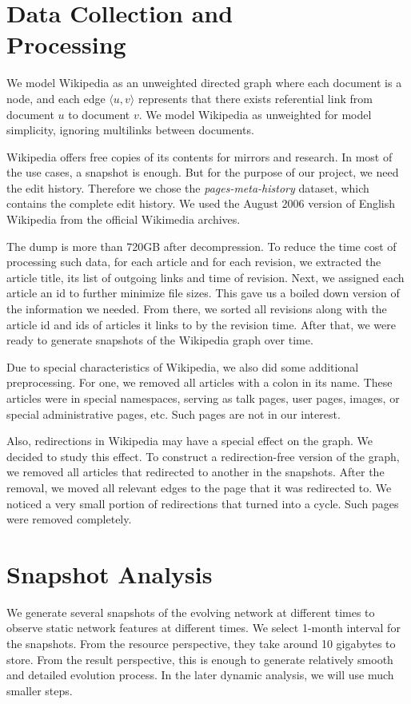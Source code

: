 \documentclass[10pt,twocolumn]{article}
\begin{document}
\section{Data Collection and\\ Processing}
We model Wikipedia as an unweighted directed graph where each document is a node, and each edge $\langle u, v \rangle$ represents that there exists referential link from document $u$ to document $v$. We model Wikipedia as unweighted for model simplicity, ignoring multilinks between documents.

Wikipedia offers free copies of its contents for mirrors and research. In most of the use cases, a snapshot is enough. But for the purpose of our project, we need the edit history. Therefore we chose the {\it pages-meta-history} dataset, which contains the complete edit history. We used the August 2006 version of English Wikipedia from the official Wikimedia archives.

The dump is more than 720GB after decompression. To reduce the time cost of processing such data, for each article and for each revision, we extracted the article title, its list of outgoing links and time of revision. Next, we assigned each article an id to further minimize file sizes. This gave us a boiled down version of the information we needed. From there, we sorted all revisions along with the article id and ids of articles it links to by the revision time. After that, we were ready to generate snapshots of the Wikipedia graph over time.

Due to special characteristics of Wikipedia, we also did some additional preprocessing. For one, we removed all articles with a colon in its name. These articles were in special namespaces, serving as talk pages, user pages, images, or special administrative pages, etc. Such pages are not in our interest.

Also, redirections in Wikipedia may have a special effect on the graph. We decided to study this effect. To construct a redirection-free version of the graph, we removed all articles that redirected to another in the snapshots. After the removal, we moved all relevant edges to the page that it was redirected to. We noticed a very small portion of redirections that turned into a cycle. Such pages were removed completely.

\section{Snapshot Analysis}
We generate several snapshots of the evolving network at different times to observe static network features at different times. We select 1-month interval for the snapshots. From the resource perspective, they take around 10 gigabytes to store. From the result perspective, this is enough to generate relatively smooth and detailed evolution process. In the later dynamic analysis, we will use much smaller steps.
\end{document}
